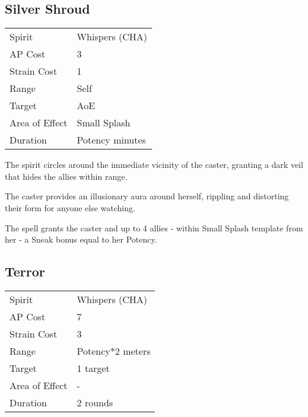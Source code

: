 \documentclass[11pt,a4paper,twocolumn]{book}
\begin{document}
\subsection*{Silver Shroud}
{
	\begin{tabu} to 75mm{| X[l,4] | X[l,7] |}
		\hline
		Spirit         & Whispers (CHA)  \\
		AP Cost        & 3               \\
		Strain Cost    & 1               \\
		Range          & Self            \\
		Target         & AoE             \\
		Area of Effect & Small Splash    \\
		Duration       & Potency minutes \\ \hline
	\end{tabu}
	
}

\medskip

The spirit circles around the immediate vicinity of the caster, granting a dark veil that hides the allies within range.

The caster provides an illusionary aura around herself, rippling and distorting their form for anyone else watching.

The spell grants the caster and up to 4 allies - within Small Splash template from her - a Sneak bonus equal to her Potency.



\subsection*{Terror}
{
	\begin{tabu} to 75mm{| X[l,4] | X[l,7] |}
		\hline
		Spirit         & Whispers (CHA) \\
		AP Cost        & 7               \\
		Strain Cost    & 3               \\
		Range          & Potency*2 meters               \\
		Target         & 1 target               \\
		Area of Effect & -               \\
		Duration       & 2 rounds               \\ \hline
	\end{tabu}
	
}
\end{document}
